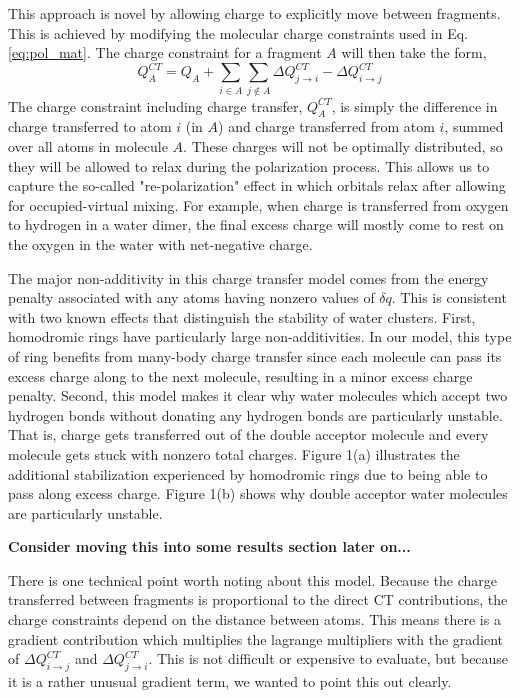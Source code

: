 \documentclass[journal=jacsat,manuscript=article]{achemso}
\begin{document}
This approach is novel by allowing charge to explicitly move between
fragments. This is achieved by modifying the molecular charge constraints used in Eq. \ref{eq:pol_mat}.
The charge constraint for a fragment $A$ will then take the form,
\begin{equation}
  Q^{CT}_A=Q_A+\sum_{i\in A}\sum_{j\notin A}\Delta Q^{CT}_{j\rightarrow i}-\Delta Q^{CT}_{i\rightarrow j}
  \label{eq:charge_constraint}
\end{equation}
The charge constraint including charge transfer, $Q^{CT}_A$, is simply the
difference in charge transferred to atom $i$ (in $A$) and charge transferred from atom
$i$, summed over all atoms in molecule $A$. These charges will not be optimally
distributed, so they will be allowed to relax during the polarization process.
This allows us to capture the so-called "re-polarization"\cite{khaliullin2007unravelling}
effect in which orbitals relax after allowing for occupied-virtual mixing.
For example, when charge is transferred from oxygen to hydrogen in a water
dimer, the final excess charge will mostly come to rest on the oxygen in
the water with net-negative charge.

The major non-additivity in this charge transfer model comes from
the energy penalty associated with any atoms having nonzero values of $\delta q$.
This is consistent with two known effects that distinguish the stability of water clusters.
First, homodromic rings have particularly large non-additivities.\cite{xantheas2000cooperativity}
In our model, this type of ring benefits from many-body charge transfer since each molecule
can pass its excess charge along to the next molecule, resulting in a minor excess charge penalty.
Second, this model makes it clear why water molecules which accept two hydrogen bonds without
donating any hydrogen bonds are particularly unstable.\cite{kirov2008identifying} That is, charge
gets transferred out of the double acceptor molecule and every molecule gets
stuck with nonzero total charges. Figure 1(a) illustrates the additional stabilization
experienced by homodromic rings due to being able to pass along excess charge. Figure 1(b)
shows why double acceptor water molecules are particularly unstable.

\textbf{Consider moving this into some results section later on...}



There is one technical point worth noting about this model. Because the
charge transferred between fragments is proportional to the direct CT contributions,
the charge constraints depend on the distance between atoms. This means there
is a gradient contribution which multiplies the lagrange multipliers
with the gradient of $\Delta Q^{CT}_{i\rightarrow j}$ and $\Delta Q^{CT}_{j\rightarrow i}$.
This is not difficult or expensive to evaluate, but because it is a rather
unusual gradient term, we wanted to point this out clearly.
\end{document}
